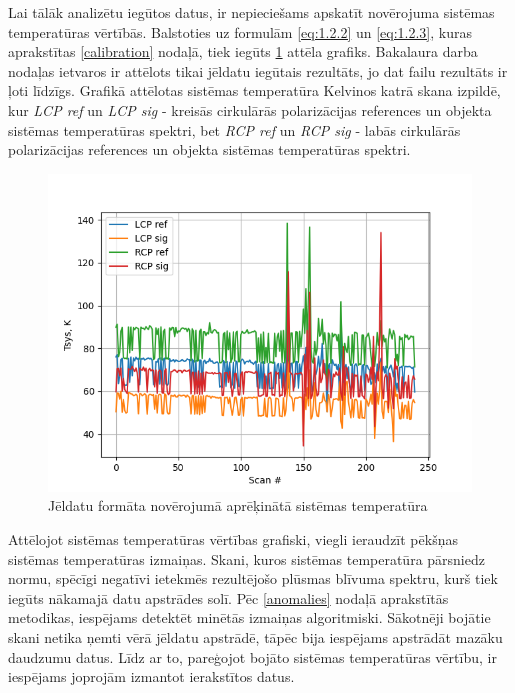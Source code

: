 Lai tālāk analizētu iegūtos datus, ir nepieciešams apskatīt novērojuma sistēmas temperatūras vērtībās. Balstoties uz formulām \ref{eq:1.2.2} un \ref{eq:1.2.3}, kuras aprakstītas \ref{calibration} nodaļā, tiek iegūts \ref{fig:tsys-atlas-raw} attēla grafiks. Bakalaura darba nodaļas ietvaros ir attēlots tikai jēldatu iegūtais rezultāts, jo dat failu rezultāts ir ļoti līdzīgs. Grafikā attēlotas sistēmas temperatūra Kelvinos katrā skana izpildē, kur \textit{LCP ref} un \textit{LCP sig} - kreisās cirkulārās polarizācijas references un objekta sistēmas temperatūras spektri, bet \textit{RCP ref} un \textit{RCP sig} - labās cirkulārās polarizācijas references un objekta sistēmas temperatūras spektri.



\begin{figure}[H]
\centering
\includegraphics[width=\textwidth]{images/created/tsys-raw-atlas-1.png}
\caption{Jēldatu formāta novērojumā aprēķinātā sistēmas temperatūra}
\label{fig:tsys-atlas-raw}
\end{figure}

Attēlojot sistēmas temperatūras vērtības grafiski, viegli ieraudzīt pēkšņas sistēmas temperatūras izmaiņas. Skani, kuros sistēmas temperatūra pārsniedz normu, spēcīgi negatīvi ietekmēs rezultējošo plūsmas blīvuma spektru, kurš tiek iegūts nākamajā datu apstrādes solī. Pēc \ref{anomalies} nodaļā aprakstītās metodikas, iespējams detektēt minētās izmaiņas algoritmiski. Sākotnēji bojātie skani netika ņemti vērā jēldatu apstrādē, tāpēc bija iespējams apstrādāt mazāku daudzumu datus. Līdz ar to, pareģojot bojāto sistēmas temperatūras vērtību, ir iespējams joprojām izmantot ierakstītos datus.

